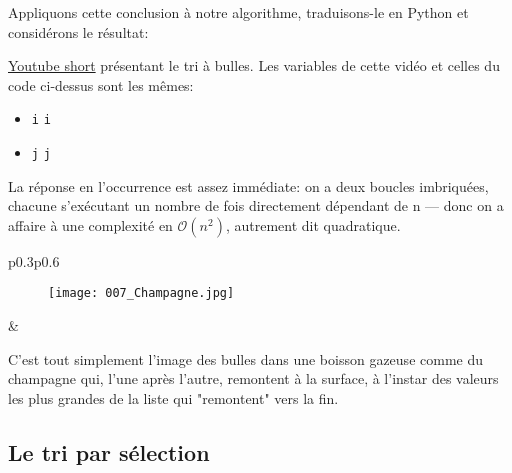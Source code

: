 \documentclass[12pt]{article}
\begin{document}
	Appliquons cette conclusion à notre algorithme, traduisons-le en Python et considérons le résultat:
	
	\begin{MaVid}
		\href{https://www.youtube.com/shorts/y2AghjB4Wxs?feature=share}{Youtube short} présentant le tri à bulles. Les variables de cette vidéo et celles du code ci-dessus sont les mêmes:
		\begin{itemize}
			\item \texttt{i} \quad \faExchange \quad \texttt{i}
			\item \texttt{j} \quad \faExchange \quad \texttt{j}
		\end{itemize}
	\end{MaVid}
	
	
	\begin{MaReponse}
		La réponse en l'occurrence est assez immédiate: on a deux boucles imbriquées, chacune s'exécutant un nombre de fois directement dépendant de n --- donc on a affaire à une complexité en $\mathcal{O}(n^2)$, autrement dit quadratique.
	\end{MaReponse}
	
	
	\begin{MaReponse}
		\begin{tabular}{p{0.3\textwidth}p{0.6\textwidth}}
			\begin{minipage}{\linewidth}
				\begin{figure}[H]
					\centering
					\texttt{[image: 007\_Champagne.jpg]}
				\end{figure}
			\end{minipage}
			&
			\begin{minipage}{\linewidth}
				C'est tout simplement l'image des bulles dans une boisson gazeuse comme du champagne qui, l'une après l'autre, remontent à la surface, à l'instar des valeurs les plus grandes de la liste qui "remontent" vers la fin.
			\end{minipage}
		\end{tabular}			
	\end{MaReponse}
		
	\subsection{Le tri par sélection}
\end{document}
